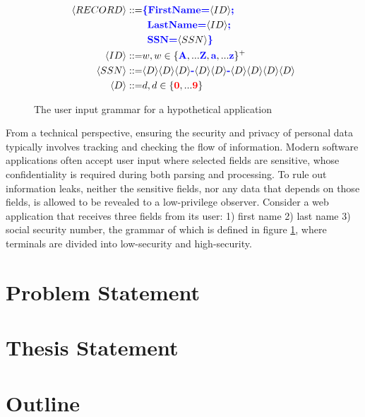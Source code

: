 \begin{figure}[tbp]
  \small
  \begin{align*}
    \langle RECORD \rangle ::= & {\color{blue} \textbf{\{FirstName=}} \langle ID \rangle {\color{blue} \textbf{;}} \\
                               & \enspace {\color{blue} \textbf{LastName=}} \langle ID \rangle {\color{blue} \textbf{;}} \\
                               & \enspace {\color{blue} \textbf{SSN=}} \langle SSN \rangle {\color{blue} \textbf{\}}} \\
    \langle ID \rangle     ::= & w , w \in \{ {\color{blue} \textbf{A}}, ... {\color{blue} \textbf{Z}}, {\color{blue} \textbf{a}}, ... {\color{blue} \textbf{z}} \}^{+} \\
    \langle SSN \rangle    ::= & \langle D \rangle \langle D \rangle \langle D \rangle {\color{blue} \textbf{-}}
                                 \langle D \rangle \langle D \rangle {\color{blue} \textbf{-}}
                                 \langle D \rangle \langle D \rangle \langle D \rangle \langle D \rangle \\
    \langle D \rangle      ::= & d , d \in \{ {\color{red} \textbf{0}}, ... {\color{red} \textbf{9}} \}
  \end{align*}
  \caption{The user input grammar for a hypothetical application}
  \label{fig:grammar}
\end{figure}

From a technical perspective, ensuring the security and privacy of
personal data typically involves tracking and checking
the flow of information.
Modern software applications often accept user input where
selected fields are sensitive, whose confidentiality is required
during both parsing and processing. To rule out information leaks,
neither the sensitive fields, nor any data that depends on those fields,
is allowed to be revealed to a low-privilege observer.
Consider a web application that receives three fields from its user:
1) first name 2) last name 3) social security number, the grammar of which
is defined in figure \ref{fig:grammar}, where terminals are divided into
low-security and high-security.

\section{Problem Statement}

\section{Thesis Statement}


\section{Outline}
